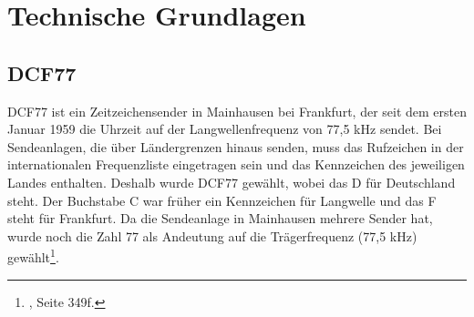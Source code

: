 \section{Technische Grundlagen}
\subsection{DCF77}
DCF77 ist ein Zeitzeichensender in Mainhausen bei Frankfurt, der seit dem ersten Januar 1959 die Uhrzeit auf der Langwellenfrequenz von 77,5 kHz sendet. Bei Sendeanlagen, die über Ländergrenzen hinaus senden, muss das Rufzeichen in der internationalen Frequenzliste eingetragen sein und das Kennzeichen des jeweiligen Landes enthalten. Deshalb wurde DCF77 gewählt, wobei das D für Deutschland steht. Der Buchstabe C war früher ein Kennzeichen für Langwelle und das F steht für Frankfurt. Da die Sendeanlage in Mainhausen mehrere Sender hat, wurde noch die Zahl 77 als Andeutung auf die Trägerfrequenz (77,5 kHz) gewählt\footnote{\cite{dcf77}, Seite 349f.}.

